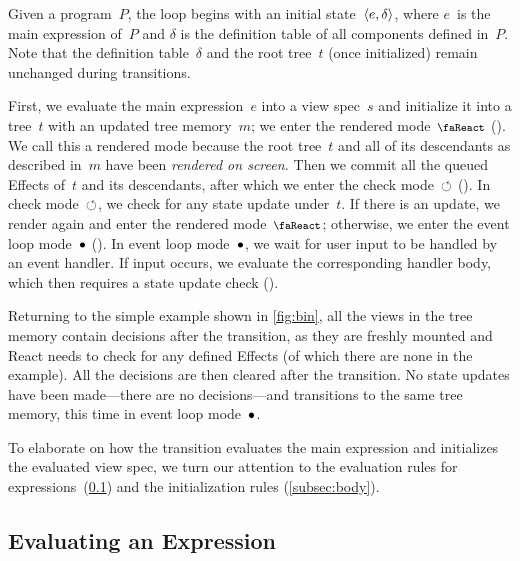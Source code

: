 Given a program~$P$, the loop begins with an initial state~$\langle e, \delta\rangle$, where $e$~is the main expression of~$P$ and $\delta$ is the definition table of all components defined in~$P$.
Note that the definition table~$\delta$ and the root tree~$t$ (once initialized) remain unchanged during transitions.

First, we evaluate the main expression~$e$ into a view spec~$s$ and initialize it into a tree~$t$ with an updated tree memory~$m$; we enter the rendered mode~$\rendermode$ ().
We call this a rendered mode because the root tree~$t$ and all of its descendants as described in~$m$ have been \emph{rendered on screen.}
Then we commit all the queued Effects of~$t$ and its descendants, after which we enter the check mode~$\circlearrowleft$ ().
In check mode~$\circlearrowleft$, we check for any state update under~$t$.
If there is an update, we render again and enter the rendered mode~$\rendermode$; otherwise, we enter the event loop mode~$\bullet$ ().
In event loop mode~$\bullet$, we wait for user input to be handled by an event handler.
If input occurs, we evaluate the corresponding handler body, which then requires a state update check ().

Returning to the simple example shown in \cref{fig:bin}, all the views in the tree memory contain  decisions after the  transition, as they are freshly mounted and React needs to check for any defined Effects (of which there are none in the example).
All the  decisions are then cleared after the  transition.
No state updates have been made---there are no  decisions---and  transitions to the same tree memory, this time in event loop mode~$\bullet$.

To elaborate on how the transition  evaluates the main expression and initializes the evaluated view spec, we turn our attention to the evaluation rules for expressions~(\cref{subsec:eval}) and the initialization rules (\cref{subsec:body}).


\subsection{Evaluating an Expression}\label{subsec:eval}
